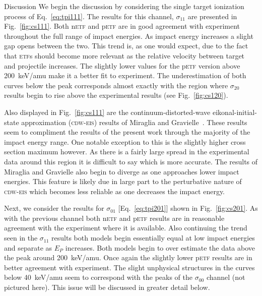 \documentclass[aps, pra, reprint, groupedaddress, amsfonts, longbibliography,
               amsmath, amssymb, showpacs, nofootinbib]{revtex4-1}
\begin{document}
\begin{section}{Discussion \label{sec:disc}}
   We begin the discussion by considering the single target ionization process of Eq.~\eqref{eq:tpi111}.
   The results for this channel, $\sigma_{11}$ are presented in Fig.~\ref{fig:cs111}. Both n\textsc{etf}
   and p\textsc{etf} are in good agreement with experiment throughout the full range of impact energies.
   As impact energy increases a slight gap opens between the two. This trend is, as one would expect,
   due to the fact that \textsc{etf}s should become more relevant as the relative velocity between
   target and projectile increases. The slightly lower values for the p\textsc{etf} version above
   200~keV/amu make it a better fit to experiment. The underestimation of both curves below the peak
   corresponds almost exactly with the region where $\sigma_{20}$ results begin to rise above the
   experimental results (see Fig.~\ref{fig:cs120}).

   Also displayed in Fig.~\ref{fig:cs111} are the continuum-distorted-wave eikonal-initial-state
   approximation (\textsc{cdw-eis}) results of Miraglia and Gravielle~\cite{MG-10}. These results seem
   to compliment the results of the present work through the majority of the impact energy range. One
   notable exception to this is the slightly higher cross section maximum however. As there is a fairly
   large spread in the experimental data around this region it is difficult to say which is more
   accurate. The results of Miraglia and Gravielle also begin to diverge as one approaches lower
   impact energies. This feature is likely due in large part to the perturbative nature of
   \textsc{cdw-eis} which becomes less reliable as one decreases the impact energy.

   Next, we consider the results for $\sigma_{01}$ [Eq.~\eqref{eq:tpi201}] shown in
   Fig.~\ref{fig:cs201}. As with the previous channel both n\textsc{etf} and p\textsc{etf} results are
   in reasonable agreement with the experiment where it is available. Also continuing the trend seen in
   the $\sigma_{11}$ results both models begin essentially equal at low impact energies and separate as
   $E_P$ increases. Both models begin to over estimate the data above the peak around 200~keV/amu. Once
   again the slightly lower p\textsc{etf} results are in better agreement with experiment. The slight
   unphysical structures in the curves below 40~keV/amu seem to correspond with the peaks of the
   $\sigma_{00}$ channel (not pictured here). This issue will be discussed in greater detail below.


\end{section}
\end{document}
